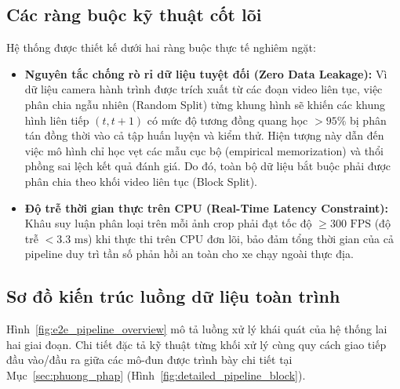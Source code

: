 \subsection{Các ràng buộc kỹ thuật cốt lõi}
\label{subsec:rang_buoc_ky_thuat}

Hệ thống được thiết kế dưới hai ràng buộc thực tế nghiêm ngặt:

\begin{itemize}
    \item \textbf{Nguyên tắc chống rò rỉ dữ liệu tuyệt đối (Zero Data Leakage):} Vì dữ liệu camera hành trình được trích xuất từ các đoạn video liên tục, việc phân chia ngẫu nhiên (Random Split) từng khung hình sẽ khiến các khung hình liên tiếp $(t, t + 1)$ có mức độ tương đồng quang học $> 95\%$ bị phân tán đồng thời vào cả tập huấn luyện và kiểm thử. Hiện tượng này dẫn đến việc mô hình chỉ học vẹt các mẫu cục bộ (empirical memorization) và thổi phồng sai lệch kết quả đánh giá. Do đó, toàn bộ dữ liệu bắt buộc phải được phân chia theo khối video liên tục (Block Split).
    \item \textbf{Độ trễ thời gian thực trên CPU (Real-Time Latency Constraint):} Khâu suy luận phân loại trên mỗi ảnh crop phải đạt tốc độ $\ge 300\text{ FPS}$ (độ trễ $< 3.3\text{ ms}$) khi thực thi trên CPU đơn lõi, bảo đảm tổng thời gian của cả pipeline duy trì tần số phản hồi an toàn cho xe chạy ngoài thực địa.
\end{itemize}

\subsection{Sơ đồ kiến trúc luồng dữ liệu toàn trình}
\label{subsec:so_do_luong_du_lieu}

Hình~\ref{fig:e2e_pipeline_overview} mô tả luồng xử lý khái quát của hệ thống lai hai giai đoạn. Chi tiết đặc tả kỹ thuật từng khối xử lý cùng quy cách giao tiếp đầu vào/đầu ra giữa các mô-đun được trình bày chi tiết tại Mục~\ref{sec:phuong_phap} (Hình~\ref{fig:detailed_pipeline_block}).

